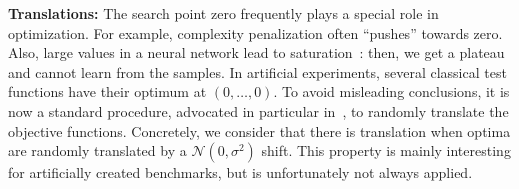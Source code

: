 \textbf{Translations:} {The search point} zero frequently plays a special role in optimization. For example, complexity penalization often ``pushes'' towards zero. 
 {Also, large values in a neural network lead to saturation~\cite{xavier}: then, we get a plateau and cannot learn from the samples.} %
In artificial experiments, several classical test functions have their optimum at $(0,\ldots,0)$. To avoid misleading conclusions, it is now a standard procedure, advocated in particular in~\cite{bbob}, to randomly translate the objective functions. %
Concretely, we consider that there is translation when optima are randomly translated by a ${\mathcal N}(0,\sigma^2)$ shift. This property is mainly interesting for artificially created benchmarks, but is unfortunately not always applied.


